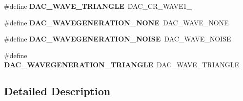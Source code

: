 \begin{DoxyCompactItemize}
\#define {\bfseries D\+A\+C\+\_\+\+W\+A\+V\+E\+\_\+\+T\+R\+I\+A\+N\+G\+LE}~D\+A\+C\+\_\+\+C\+R\+\_\+\+W\+A\+V\+E1\+\_
\item 
\mbox{\label{group___h_a_l___d_a_c___aliased___defines_ga646bbf1bac854ad6c65dcd932dd97057}} 
\#define {\bfseries D\+A\+C\+\_\+\+W\+A\+V\+E\+G\+E\+N\+E\+R\+A\+T\+I\+O\+N\+\_\+\+N\+O\+NE}~D\+A\+C\+\_\+\+W\+A\+V\+E\+\_\+\+N\+O\+NE
\item 
\mbox{\label{group___h_a_l___d_a_c___aliased___defines_ga983df0b8c271df50b8d230f9cd79b28e}} 
\#define {\bfseries D\+A\+C\+\_\+\+W\+A\+V\+E\+G\+E\+N\+E\+R\+A\+T\+I\+O\+N\+\_\+\+N\+O\+I\+SE}~D\+A\+C\+\_\+\+W\+A\+V\+E\+\_\+\+N\+O\+I\+SE
\item 
\mbox{\label{group___h_a_l___d_a_c___aliased___defines_ga157dcc41215ec9a313621a1b3e5ba1ab}} 
\#define {\bfseries D\+A\+C\+\_\+\+W\+A\+V\+E\+G\+E\+N\+E\+R\+A\+T\+I\+O\+N\+\_\+\+T\+R\+I\+A\+N\+G\+LE}~D\+A\+C\+\_\+\+W\+A\+V\+E\+\_\+\+T\+R\+I\+A\+N\+G\+LE
\end{DoxyCompactItemize}


\subsection{Detailed Description}
